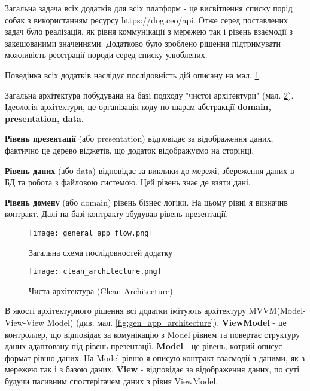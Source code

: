 Загальна задача всіх додатків для всіх платформ - це висвітлення списку порід собак з використанням ресурсу https://dog.ceo/api.
Отже серед поставлених задач було реалізація, як рівня коммунікації з мережею так і рівень взаємодії з закешованими
значеннями. Додатково було зроблено рішення підтримувати можливість реєстрації породи серед списку улюблених.

Поведінка всіх додатків наслідує послідовність дій описану на мал. \ref{fig:gen_app_flow}.

Загальна архітектура побудувана на базі подходу "чистої архітектури" (мал. \ref{fig:clean_architecture}).
Ідеологія архітектури, це організація коду по шарам абстракції \textbf{domain, presentation, data}.

\textbf{Рівень презентації} (або presentation) відповідає за відображення даних, фактично це дерево віджетів,
що додаток відображуємо на сторінці.

\textbf{Рівень даних} (або data) відповідає за виклики до мережі, збереження даних в БД та робота з файловою системою.
Цей рівень знає де взяти дані.

\textbf{Рівень домену} (або domain) рівень бізнес логіки. На цьому рівні я визначив контракт. Далі на базі контракту
збудував рівень презентації.

\begin{figure}
    \begin{center}
        \texttt{[image: general\_app\_flow.png]}
        \caption{Загальна схема послідовностей додатку}
        \label{fig:gen_app_flow}
    \end{center}
\end{figure}

\begin{figure}
    \begin{center}
        \texttt{[image: clean\_architecture.png]}
        \caption{Чиста архітектура (Clean Architecture)}
        \label{fig:clean_architecture}
    \end{center}
\end{figure}

В якості архітектурного рішення всі додатки імітують архітектуру MVVM(Model-View-View Model) (див. мал. \ref{fig:gen_app_architecture}).
\textbf{ViewModel} - це контроллер, що відповідає за комунікацію з Model рівнем та повертає структуру даних адаптовану під рівень презентації.
\textbf{Model} - це рівень, котрий описує формат рівню даних. На Model рівню я описую контракт взаємодії з даними, як з
мережею так і з базою даних.
\textbf{View} - відповідає за відображення даних, по суті будучи пасивним спостерігачем даних з рівня ViewModel.

